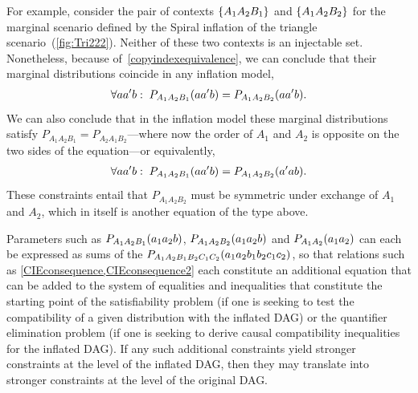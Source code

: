 \documentclass[aps,english,superscriptaddress,onecolumn,twoside,longbibliography,pra,floatfix,fleqn,nofootinbib]{revtex4-1}%
\theoremstyle{definition}
\newcommand{\p}[2][]{{P_{#1}}\parenths{#2}}
\DeclarePairedDelimiter{\parenths}{\lparen}{\rparen}
\DeclarePairedDelimiter{\braces}{\lbrace}{\rbrace}
\newcommand{\brackets}[1]{\braces*{#1}}
\begin{document}
For example, consider the pair of contexts $\brackets{A_1 A_2 B_1}$ and $\brackets{A_1 A_2 B_2}$ for the marginal scenario defined by the Spiral inflation of the triangle scenario~(\cref{fig:Tri222}). Neither of these two contexts is an injectable set.  Nonetheless, because of~\cref{copyindexequivalence}, we can conclude that their marginal distributions coincide in any inflation model,
\begin{align}\label{CIEconsequence}
\forall{a a' b}:\;\p[A_1 A_2 B_1]{a a' b} = \p[A_1 A_2 B_2]{a a' b}.
\end{align}
We can also conclude that in the inflation model these marginal distributions satisfy  $P_{A_1 A_2 B_1}=P_{A_2 A_1 B_2}$---where now the order of $A_1$ and $A_2$ is opposite on the two sides of the equation---or equivalently, 
\begin{align}\label{CIEconsequence2}
\forall{a a' b}:\;\p[A_1 A_2 B_1]{a a' b} = \p[A_1 A_2 B_2]{a' a b}.
\end{align}
These constraints entail that $P_{A_1 A_2 B_2}$ must be symmetric under exchange of $A_1$ and $A_2$, which in itself is another equation of the type above.



Parameters such as $\p[A_1 A_2 B_1]{a_1 a_2 b}$, $\p[A_1 A_2 B_2]{a_1 a_2 b}$ and $\p[A_1 A_2]{a_1 a_2}$ can each be expressed as sums of the $\p[A_1 A_2 B_1 B_2 C_1 C_2]{a_1 a_2 b_1 b_2 c_1 c_2}$, so that relations such as \cref{CIEconsequence,CIEconsequence2} each constitute an additional equation that can be added to the system of equalities and inequalities that constitute the starting point of the satisfiability problem (if one is seeking to test the compatibility of a given distribution with the inflated DAG) or the quantifier elimination problem (if one is seeking to derive causal compatibility inequalities for the inflated DAG).  If any such additional constraints yield stronger constraints at the level of the inflated DAG, then they may translate into stronger constraints at the level of the original DAG.
\end{document}
